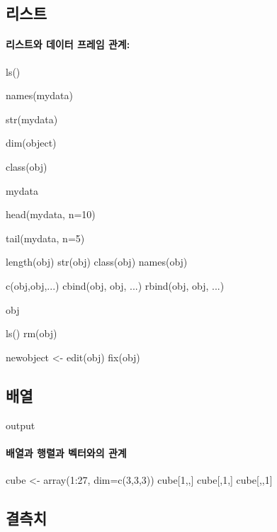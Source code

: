 \documentclass{report}
\begin{document}
\subsection{리스트}
\paragraph{리스트와 데이터 프레임 관계:}
	\begin{Schunk}
	\begin{Soutput}
	ls()

	names(mydata)

	str(mydata)


	dim(object)

	class(obj)

	mydata

	head(mydata, n=10)

	tail(mydata, n=5) 

	length(obj)
	str(obj)
	class(obj)
	names(obj)
	
	c(obj,obj,...)
	cbind(obj, obj, ...)
	rbind(obj, obj, ...)
	
	obj
	
	ls()
	rm(obj)
	
	newobject <- edit(obj)
	fix(obj)
	\end{Soutput}
	\end{Schunk}

\subsection{배열}
\begin{Schunk}
\begin{Soutput}
output
\end{Soutput}
\end{Schunk}

\paragraph{배열과 행렬과 벡터와의 관계}

\begin{Schunk}
\begin{Soutput}
cube <- array(1:27, dim=c(3,3,3))
cube[1,,]
cube[,1,]
cube[,,1]

\end{Soutput}
\end{Schunk}

\subsection{결측치}
\end{document}
